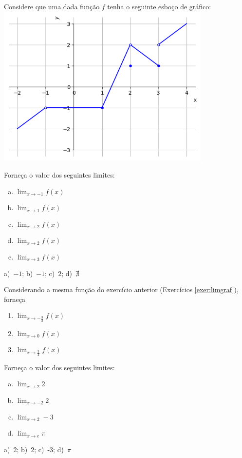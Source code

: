 \begin{exer}\label{exer:limgraf}
  Considere que uma dada função $f$ tenha o seguinte esboço de gráfico:
  \includegraphics[width=0.8\textwidth]{./cap_lim/dados/fig_exer_limgraf/fig_exer_limgraf}

  Forneça o valor dos seguintes limites:
  \begin{enumerate}[a)]
  \item $\displaystyle \lim_{x\to -1} f(x)$
  \item $\displaystyle \lim_{x\to 1} f(x)$
  \item $\displaystyle \lim_{x\to 2} f(x)$
  \item $\displaystyle \lim_{x\to 2} f(x)$
  \item $\displaystyle \lim_{x\to 3} f(x)$
  \end{enumerate}
\end{exer}
\begin{resp}
  a)~$-1$; b)~$-1$; c)~$2$; d)~$\nexists$
\end{resp}

\begin{exer}
  Considerando a mesma função do exercício anterior (Exercícios \ref{exer:limgraf}), forneça
  \begin{enumerate}
  \item $\displaystyle \lim_{x\to -\frac{3}{2}} f(x)$
  \item $\displaystyle \lim_{x\to 0} f(x)$
  \item $\displaystyle \lim_{x\to \frac{3}{4}} f(x)$
  \end{enumerate}
\end{exer}

\begin{exer}
  Forneça o valor dos seguintes limites:
  \begin{enumerate}[a)]
  \item $\displaystyle \lim_{x\to 2} 2$
  \item $\displaystyle \lim_{x\to -2} 2$
  \item $\displaystyle \lim_{x\to 2} -3$
  \item $\displaystyle \lim_{x\to e} \pi$
  \end{enumerate}
\end{exer}
\begin{resp}
  a)~2; b)~2; c)~-3; d)~$\pi$
\end{resp}

